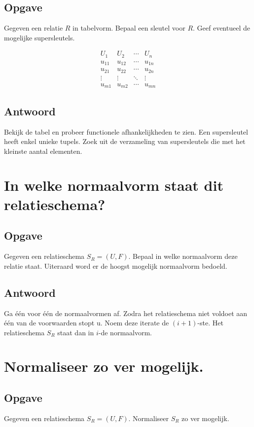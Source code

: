 \documentclass[normaalvormen.tex]{subfiles}
\begin{document}
\subsection*{Opgave}
Gegeven een relatie $R$ in tabelvorm. Bepaal een sleutel voor $R$.
Geef eventueel de mogelijke supersleutels.
\begin{figure}
\centering
\[
\begin{array}{c|c|c|c}
U_1 & U_2 & \cdots & U_n\\\hline
u_{11} & u_{12} & \cdots & u_{1n}\\
u_{21} & u_{22} & \cdots & u_{2n}\\
\vdots & \vdots & \ddots & \vdots\\
u_{m1} & u_{m2} & \cdots & u_{mn}
\end{array}
\]
\end{figure}

\subsection*{Antwoord}
Bekijk de tabel en probeer functionele afhankelijkheden te zien. Een supersleutel heeft enkel unieke tupels. Zoek uit de verzameling van supersleutels die met het kleinste aantal elementen.

\section{In welke normaalvorm staat dit relatieschema?}
\subsection*{Opgave}
Gegeven een relatieschema $S_{R} = (U,F)$. Bepaal in welke normaalvorm deze relatie staat. Uiteraard word er de hoogst mogelijk normaalvorm bedoeld.
\subsection*{Antwoord}
Ga \'e\'en voor \'e\'en de normaalvormen af. Zodra het relatieschema niet voldoet aan \'e\'en van de voorwaarden stopt u. Noem deze iterate de $(i+1)$-ste. Het relatieschema $S_{R}$ staat dan in $i$-de normaalvorm.

\section{Normaliseer zo ver mogelijk.}
\subsection*{Opgave}
Gegeven een relatieschema $S_{R} = (U,F)$. Normaliseer $S_{R}$ zo ver mogelijk.
\end{document}
